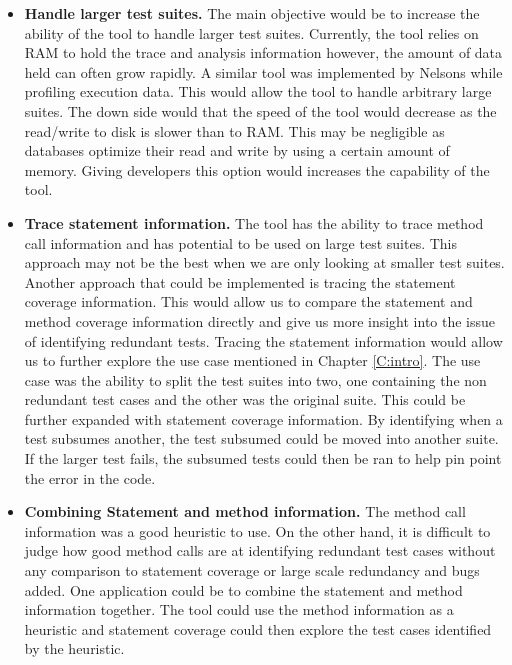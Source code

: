 \begin{itemize}

\item \textbf{Handle larger test suites.} The main objective would be to increase the ability of the tool to handle larger test suites. Currently, the tool relies on RAM to hold the trace and analysis information however, the amount of data held can often grow rapidly. A similar tool was implemented by Nelsons \cite{nelson2012profiling} while profiling execution data. This would allow the tool to handle arbitrary large suites. The down side would that the speed of the tool would decrease as the read/write to disk is slower than to RAM. This may be negligible as databases optimize their read and write by using a certain amount of memory. Giving developers this option would increases the capability of the tool. 

\item \textbf{Trace statement information.} The tool has the ability to trace method call information and has potential to be used on large test suites. This approach may not be the best when we are only looking at smaller test suites. Another approach that could be implemented is tracing the statement coverage information. This would allow us to compare the statement and method coverage information directly and give us more insight into the issue of identifying redundant tests. Tracing the statement information would allow us to further explore the use case mentioned in Chapter \ref{C:intro}. The use case was the ability to split the test suites into two, one containing the non redundant test cases and the other was the original suite. This could be further expanded with statement coverage information. By identifying when a test subsumes another, the test subsumed could be moved into another suite. If the larger test fails, the subsumed tests could then be ran to help pin point the error in the code.

\item \textbf{Combining Statement and method information.} The method call information was a good heuristic to use. On the other hand, it is difficult to judge how good method calls are at identifying redundant test cases without any comparison to statement coverage or large scale redundancy and bugs added. One application could be to combine the statement and method information together. The tool could use the method information as a heuristic and statement coverage could then explore the test cases identified by the heuristic.

\end{itemize}

